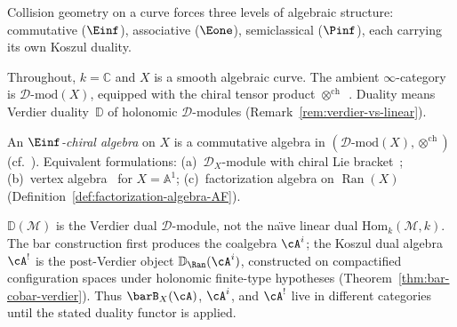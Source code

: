 Collision geometry on a curve forces three levels of algebraic
structure: commutative ($\Einf$), associative ($\Eone$),
semiclassical ($\Pinf$), each carrying its own Koszul duality.

\begin{definition}[\texorpdfstring{$\Einf$}{E-infinity}-chiral algebra = vertex algebra;
\ClaimStatusDefinitional]
\label{def:einf-chiral}
Throughout, $k = \mathbb{C}$ and $X$ is a smooth algebraic curve.
The ambient $\infty$-category is $\mathcal{D}\text{-mod}(X)$,
equipped with the chiral tensor product
$\otimes^{\mathrm{ch}}$~\cite[\S3.4]{BD04}. Duality means
Verdier duality~$\mathbb{D}$ of holonomic $\mathcal{D}$-modules
(Remark~\ref{rem:verdier-vs-linear}).

An \emph{$\Einf$-chiral algebra} on $X$ is a commutative algebra
in $(\mathcal{D}\text{-mod}(X),\allowbreak
\otimes^{\mathrm{ch}})$
(cf.~\cite[§5.1]{HA}).
Equivalent formulations:
(a)~$\mathcal{D}_X$-module with chiral Lie
bracket~\cite[\S3.3]{BD04};
(b)~vertex algebra~\cite[\S3.7]{FBZ04} for $X = \mathbb{A}^1$;
(c)~factorization algebra on $\operatorname{Ran}(X)$
(Definition~\ref{def:factorization-algebra-AF}).
\end{definition}

\begin{remark}
\label{rem:verdier-vs-linear}
$\mathbb{D}(\mathcal{M})$ is the Verdier dual
$\mathcal{D}$-module, not the na\"{\i}ve linear dual
$\mathrm{Hom}_k(\mathcal{M}, k)$. The bar construction first
produces the coalgebra $\cA^i$; the Koszul dual algebra
$\cA^!$ is the post-Verdier object
$\mathbb{D}_{\Ran}(\cA^i)$, constructed on compactified
configuration spaces under holonomic finite-type hypotheses
(Theorem~\ref{thm:bar-cobar-verdier}). Thus
$\barB_X(\cA)$, $\cA^i$, and $\cA^!$ live in different
categories until the stated duality functor is applied.
\end{remark}

